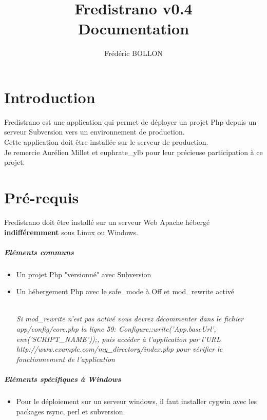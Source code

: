 \documentclass[12pt,a4paper]{report}
\author{Frédéric BOLLON}
\title{Fredistrano v0.4\\Documentation\\}
\begin{document}
\maketitle
\tableofcontents

\chapter{Introduction}
Fredistrano est une application qui permet de déployer un projet Php depuis un serveur Subversion vers un environnement de production.\\
Cette application doit \^{e}tre installée sur le serveur de production.\\

Je remercie Aurélien Millet et euphrate\_ylb pour leur précieuse participation à ce projet.

\chapter{Pré-requis}

Fredistrano doit \^{e}tre installé sur un serveur Web Apache hébergé \textbf{indifféremment} sous Linux ou Windows. 

\paragraph*{Eléments communs}
\begin{itemize}
\item
Un projet Php "versionné" avec Subversion
\item 
Un hébergement Php avec le safe\_mode à Off et mod\_rewrite activé	\\\\
\begin{small}\textit{Si mod\_rewrite n'est pas activé vous devrez décommenter dans le fichier app/config/core.php la ligne 59: Configure::write('App.baseUrl', env('SCRIPT\_NAME'));, puis accéder à l'application par l'URL\\ http://www.example.com/my\_directory/index.php pour vérifier le fonctionnement de l'application}\end{small}
\end{itemize}

\paragraph*{Eléments spécifiques à Windows}
\begin{itemize}
\item
Pour le déploiement sur un serveur windows, il faut installer cygwin avec les packages rsync, perl et subversion.

\end{itemize}
\end{document}

